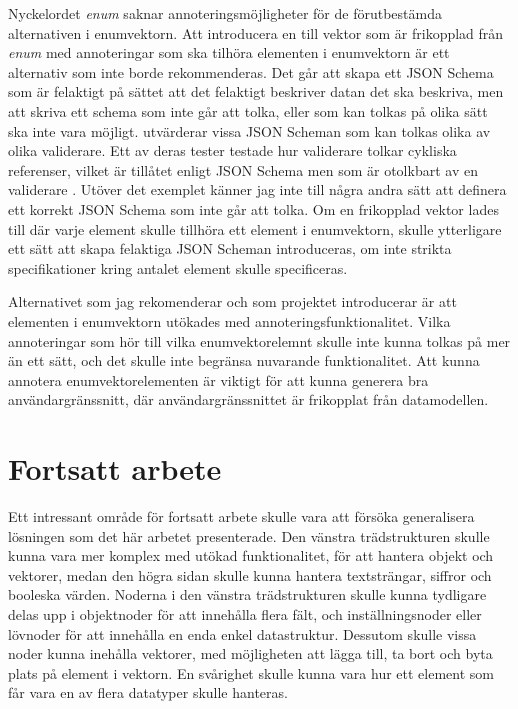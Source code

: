 Nyckelordet \textit{enum} saknar annoteringsmöjligheter för de förutbestämda alternativen i enumvektorn. Att introducera en till vektor som är frikopplad från \textit{enum} med annoteringar som ska tilhöra elementen i enumvektorn är ett alternativ som inte borde rekommenderas. Det går att skapa ett JSON Schema som är felaktigt på sättet att det felaktigt beskriver datan det ska beskriva, men att skriva ett schema som inte går att tolka, eller som kan tolkas på olika sätt ska inte vara möjligt. \citeauthor{Pezoa2016} utvärderar vissa JSON Scheman som kan tolkas olika av olika validerare. Ett av deras tester testade hur validerare tolkar cykliska referenser, vilket är tillåtet enligt JSON Schema men som är otolkbart av en validerare \cite{Pezoa2016}. Utöver det exemplet känner jag inte till några andra sätt att definera ett korrekt JSON Schema som inte går att tolka. Om en frikopplad vektor lades till där varje element skulle tillhöra ett element i enumvektorn, skulle ytterligare ett sätt att skapa felaktiga JSON Scheman introduceras, om inte strikta specifikationer kring antalet element skulle specificeras.

Alternativet som jag rekomenderar och som projektet introducerar är att elementen i enumvektorn utökades med annoteringsfunktionalitet. Vilka annoteringar som hör till vilka enumvektorelemnt skulle inte kunna tolkas på mer än ett sätt, och det skulle inte begränsa nuvarande funktionalitet. Att kunna annotera enumvektorelementen är viktigt för att kunna generera bra användargränssnitt, där användargränssnittet är frikopplat från datamodellen.

\section{Fortsatt arbete}
\label{sec:slutsats:fortsatt-arbete}
Ett intressant område för fortsatt arbete skulle vara att försöka generalisera lösningen som det här arbetet presenterade. Den vänstra trädstrukturen skulle kunna vara mer komplex med utökad funktionalitet, för att hantera objekt och vektorer, medan den högra sidan skulle kunna hantera textsträngar, siffror och booleska värden. Noderna i den vänstra trädstrukturen skulle kunna tydligare delas upp i objektnoder för att innehålla flera fält, och inställningsnoder eller lövnoder för att innehålla en enda enkel datastruktur. Dessutom skulle vissa noder kunna inehålla vektorer, med möjligheten att lägga till, ta bort och byta plats på element i vektorn. En svårighet skulle kunna vara hur ett element som får vara en av flera datatyper skulle hanteras.

